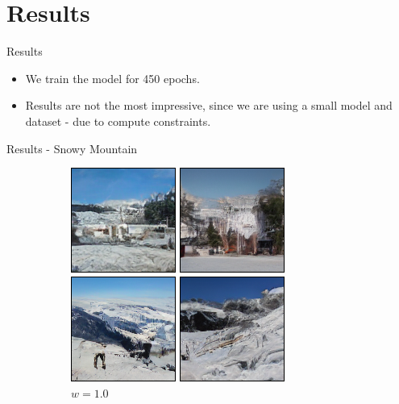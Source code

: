 \documentclass[11pt]{beamer}
\begin{document}
\section{Results}
\begin{frame}{Results}
  \begin{itemize}
    \item We train the model for 450 epochs.
    \item Results are not the most impressive, since we are using a small model and dataset - due to compute constraints.
  \end{itemize}
\end{frame}

\begin{frame}{Results - Snowy Mountain}
    \begin{figure}
      \centering
      \begin{subfigure}[b]{0.24\textwidth}
        \includegraphics[width=\linewidth]{figures/a_beautiful_snowy_mountain_landscape_1.png}
        \caption{$w=1.0$}
      \end{subfigure}
      \begin{subfigure}[b]{0.24\textwidth}

\end{subfigure}
\end{figure}
\end{frame}
\end{document}
